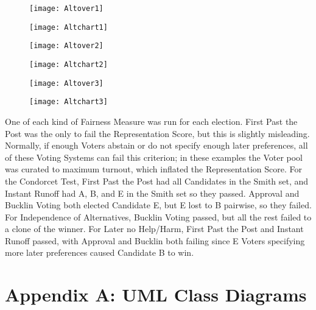 \documentclass[12pt]{article}
\begin{document}
\begin{figure}[H]
\centering
\texttt{[image: Altover1]}
\end{figure}
\begin{figure}[H]
\centering
\texttt{[image: Altchart1]}
\end{figure}
\begin{figure}[H]
\centering
\texttt{[image: Altover2]}
\end{figure}
\begin{figure}[H]
\centering
\texttt{[image: Altchart2]}
\end{figure}
\begin{figure}[H]
\centering
\texttt{[image: Altover3]}
\end{figure}
\begin{figure}[H]
\centering
\texttt{[image: Altchart3]}
\end{figure}

\qquad One of each kind of Fairness Measure was run for each election. First Past the Post was the only to fail the Representation Score, but this is slightly misleading. Normally, if enough Voters abstain or do not specify enough later preferences, all of these Voting Systems can fail this criterion; in these examples the Voter pool was curated to maximum turnout, which inflated the Representation Score. For the Condorcet Test, First Past the Post had all Candidates in the Smith set, and Instant Runoff had A, B, and E in the Smith set so they passed. Approval and Bucklin Voting both elected Candidate E, but E lost to B pairwise, so they failed. For Independence of Alternatives, Bucklin Voting passed, but all the rest failed to a clone of the winner. For Later no Help/Harm, First Past the Post and Instant Runoff passed, with Approval and Bucklin both failing since E Voters specifying more later preferences caused Candidate B to win.

\newpage
\section{Appendix A: UML Class Diagrams} \label{AppA}
\end{document}
